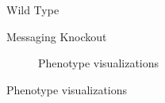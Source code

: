 \begin{figure}[!htbp]
\begin{center}
\vspace{1.0ex}

\hspace*{\fill}%
\begin{minipage}[t]{0.05\columnwidth}
\vspace{0pt} %
\end{minipage}%
\hfill
\begin{minipage}[t]{0.45\columnwidth}
\centering
\vspace{0pt} %
Wild Type
\end{minipage}%
\hfill
\begin{minipage}[t]{0.45\columnwidth}
\centering
\vspace{0pt} %
Messaging Knockout
\end{minipage}%
\hspace*{\fill}

\vspace{1.0ex}

\begin{subfigure}{\columnwidth}
  \caption{Phenotype visualizations}
  \label{fig:intermessaging-intergroup_border-phen}
\end{subfigure}

%
%


\end{center}
\end{figure}
